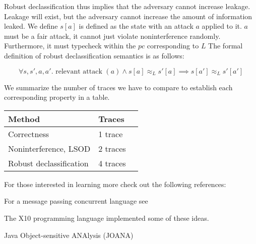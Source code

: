 \documentclass{article}
\begin{document}
\newline
Robust declassification thus implies that the adversary cannot increase leakage. Leakage will exist, but the adversary cannot increase the amount of information leaked.
We define $s[a]$ is defined as the state with an attack $a$ applied to it. $a$ must be a fair attack, it cannot just violate noninterference randomly.  Furthermore, it must typecheck within the $pc$ corresponding to $L$
 The formal definition of robust declassification semantics is as follows:

\[
\forall s,s',a,a'. \text{ relevant attack } (a) \wedge s[a] \approx_L s'[a] \implies s[a'] \approx_L s'[a']
\]




We summarize the number of traces we have to compare to establish each corresponding property in a table.

\begin{table}[h]
\begin{tabular}{|l|l|l|}
\hline
Method & Traces\\
\hline 
 Correctness & 1 trace \\\hline
 Noninterference, LSOD & 2 traces \\ \hline
 Robust declassification & 4 traces \\ \hline
\end{tabular}
\end{table}

For those interested in learning more check out the following references: 

For a message passing concurrent language see
\cite{zdancewic2003observational}

The X10 programming language implemented some of these ideas.
\cite{charles2005x10}

Java Object-sensitive ANAlysis (JOANA) \cite{milanova2005parameterized}



\end{document}
